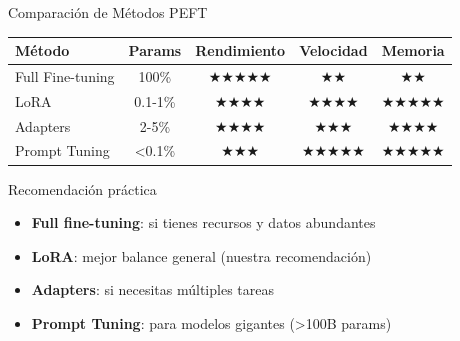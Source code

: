 \begin{frame}{Comparación de Métodos PEFT}

\begin{table}[]
\centering
\small
\begin{tabular}{|l|c|c|c|c|}
\hline
\textbf{Método} & \textbf{Params} & \textbf{Rendimiento} & \textbf{Velocidad} & \textbf{Memoria} \\ \hline
Full Fine-tuning & 100\% & ★★★★★ & ★★ & ★★ \\ \hline
LoRA & 0.1-1\% & ★★★★ & ★★★★ & ★★★★★ \\ \hline
Adapters & 2-5\% & ★★★★ & ★★★ & ★★★★ \\ \hline
Prompt Tuning & <0.1\% & ★★★ & ★★★★★ & ★★★★★ \\ \hline
\end{tabular}
\end{table}

\vspace{1em}

\begin{block}{Recomendación práctica}
\begin{itemize}
    \item \textbf{Full fine-tuning}: si tienes recursos y datos abundantes
    \item \textbf{LoRA}: mejor balance general (nuestra recomendación)
    \item \textbf{Adapters}: si necesitas múltiples tareas
    \item \textbf{Prompt Tuning}: para modelos gigantes (>100B params)
\end{itemize}
\end{block}

\end{frame}

